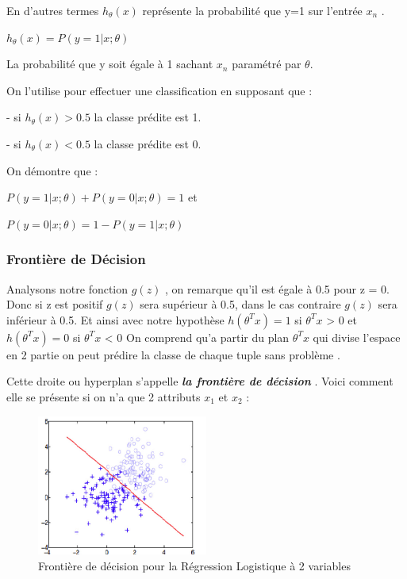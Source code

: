 En d'autres termes ${h}_{\theta}\left(x\right)$ représente la probabilité que y=1 sur l'entrée  ${x}_{n}$ .
\begin{center}
	${h}_{\theta}\left(x\right)=P(y=1|x;\theta)$
\end{center}
La probabilité que y soit égale à 1 sachant ${x}_{n}$ paramétré par $\theta$.

On l'utilise pour effectuer une classification en supposant que :

- si ${h}_{\theta}\left(x\right)> 0.5 $ la classe prédite est 1.

- si ${h}_{\theta}\left(x\right)< 0.5 $ la classe prédite est 0.

On démontre que :
\begin{center}
	$P(y=1|x;\theta) + P(y=0|x;\theta) = 1 $ et
	
	$P(y=0|x;\theta) = 1-  P(y=1|x;\theta)$
\end{center}
\subsubsection{Frontière de Décision }
Analysons notre fonction $g(z)$ , on remarque qu'il est égale à 0.5 pour z = 0.
Donc si z est positif $g(z)$ sera supérieur à 0.5, dans le cas contraire $g(z)$ sera inférieur à 0.5.
Et ainsi avec notre hypothèse
$h({\theta }^{T}{x}) = 1 $ si  ${\theta }^{T}{x}$ > 0 et 
$h({\theta }^{T}{x}) = 0 $ si  ${\theta }^{T}{x}$ < 0
On comprend qu'a partir du plan  ${\theta }^{T}{x}$ qui divise l'espace en 2 partie on peut prédire la classe de chaque tuple  sans problème .

Cette droite ou hyperplan  s'appelle \emph{\textbf{la frontière de décision }}.
Voici comment elle se présente si on n'a que 2 attributs ${x}_{1}$ et ${x}_{2}$ :
\begin{figure}[ht]
	\centering
	\includegraphics[width=0.5\textwidth]{fig/DecisionBoudary.png}
	\caption[Short caption]{Frontière de décision pour la Régression Logistique à 2 variables}
	\label{fig:image5}
\end{figure}


